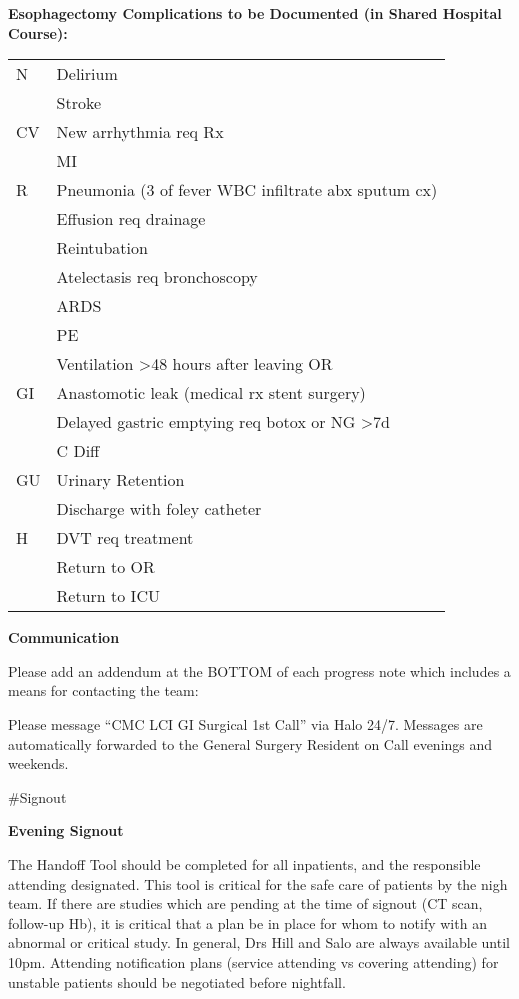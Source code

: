 \documentclass[
]{book}
\begin{document}
\textbf{Esophagectomy Complications to be Documented (in Shared Hospital Course):}

\begin{longtable}[]{@{}ll@{}}
\toprule
\endhead
N & Delirium \\
& Stroke \\
CV & New arrhythmia req Rx \\
& MI \\
R & Pneumonia (3 of fever \textbar{} WBC \textbar{} infiltrate \textbar{} abx \textbar{} sputum cx) \\
& Effusion req drainage \\
& Reintubation \\
& Atelectasis req bronchoscopy \\
& ARDS \\
& PE \\
& Ventilation \textgreater48 hours after leaving OR \\
GI & Anastomotic leak (medical rx \textbar{} stent \textbar{} surgery) \\
& Delayed gastric emptying req botox or NG \textgreater7d \\
& C Diff \\
GU & Urinary Retention \\
& Discharge with foley catheter \\
H & DVT req treatment \\
& Return to OR \\
& Return to ICU \\
\bottomrule
\end{longtable}

\textbf{Communication}

Please add an addendum at the BOTTOM of each progress note which includes a means for contacting the team:

Please message ``CMC LCI GI Surgical 1st Call'' via Halo 24/7. Messages are automatically forwarded to the General Surgery Resident on Call evenings and weekends.

\#Signout

\textbf{Evening Signout}

The Handoff Tool should be completed for all inpatients, and the responsible attending designated. This tool is critical for the safe care of patients by the nigh team. If there are studies which are pending at the time of signout (CT scan, follow-up Hb), it is critical that a plan be in place for whom to notify with an abnormal or critical study. In general, Drs Hill and Salo are always available until 10pm. Attending notification plans (service attending vs covering attending) for unstable patients should be negotiated before nightfall.
\end{document}
